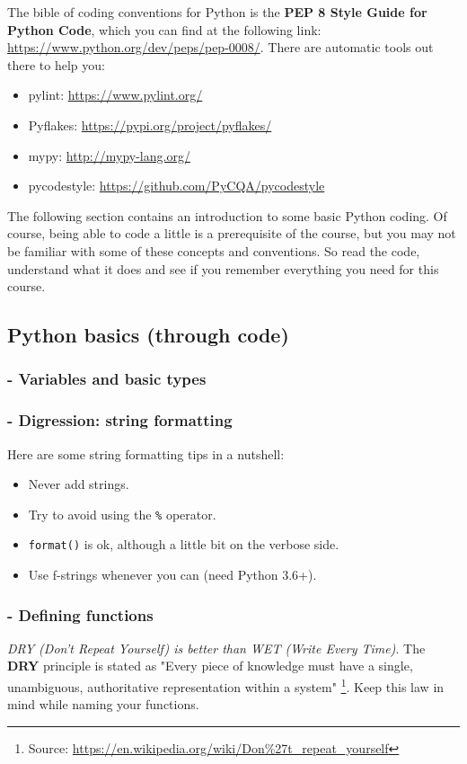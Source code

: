 The bible of coding conventions for Python is the \textbf{PEP 8 Style Guide for Python Code}, which you can find at the following link: \url{https://www.python.org/dev/peps/pep-0008/}. There are automatic tools out there to help you:
\begin{itemize}
    \item[-] pylint: \url{https://www.pylint.org/}
    \item[-] Pyflakes: \url{https://pypi.org/project/pyflakes/}
    \item[-] mypy: \url{http://mypy-lang.org/}
    \item[-] pycodestyle: \url{https://github.com/PyCQA/pycodestyle}
\end{itemize}

The following section contains an introduction to some basic Python coding. Of course, being able to code a little is a prerequisite of the course, but you may not be familiar with some of these concepts and conventions. So read the code, understand what it does and see if you remember everything you need for this course.

\subsection{Python basics (through code)}
\subsubsection{- Variables and basic types}


\subsubsection{- Digression: string formatting}


Here are some string formatting tips in a nutshell:
\begin{itemize}
    \item[-] Never add strings.
    \item[-] Try to avoid using the \texttt{\%} operator.
    \item[-] \texttt{format()} is ok, although a little bit on the verbose side.
    \item[-] Use f-strings whenever you can (need Python 3.6+).
\end{itemize}

\subsubsection{- Defining functions}
\textit{DRY (Don't Repeat Yourself) is better than WET (Write Every Time)}.
The \textbf{DRY} principle is stated as "Every piece of knowledge must have a single, unambiguous, authoritative representation within a system" \footnote{Source: \url{https://en.wikipedia.org/wiki/Don\%27t_repeat_yourself}}. Keep this law in mind while naming your functions.

